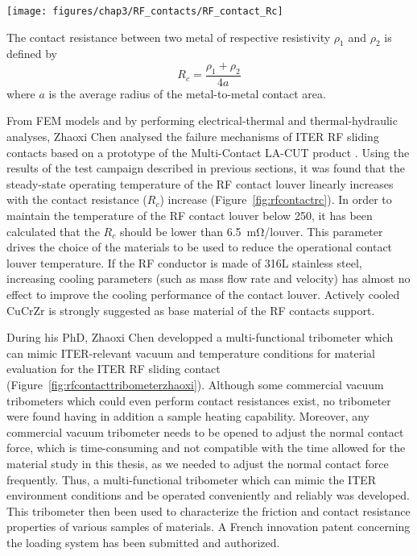 {\begin{marginfigure}
	\centering
	\texttt{[image: figures/chap3/RF\_contacts/RF\_contact\_Rc]}
	\caption{The contact resistance between two metal of respective resistivity $\rho_1$ and $\rho_2$ is defined by $$R_c=\frac{\rho_1+\rho_2}{4a}$$ where $a$ is the average radius of the metal-to-metal contact area\cite{holm2011}.}
	\label{fig:rfcontactrc}
\end{marginfigure}

From FEM models and by performing electrical-thermal and thermal-hydraulic analyses, Zhaoxi Chen analysed the failure mechanisms of ITER RF sliding contacts based on a prototype of the Multi-Contact LA-CUT product . Using the results of the test campaign described in previous sections, it was found that the steady-state operating temperature of the RF contact louver linearly increases with the contact resistance ($R_c$) increase (Figure~\ref{fig:rfcontactrc}). In order to maintain the temperature of the RF contact louver below 250\degC, it has been calculated that the $R_c$ should be lower than 6.5~$\si{\milli\ohm}$/louver. This parameter drives the choice of the materials to be used to reduce the operational contact louver temperature. If the RF conductor is made of 316L stainless steel, increasing cooling parameters (such as mass flow rate and velocity) has almost no effect to improve the cooling performance of the contact louver. Actively cooled CuCrZr is strongly suggested as base material of the RF contacts support. 

During his PhD, Zhaoxi Chen developped a multi-functional tribometer  which can mimic ITER-relevant vacuum and temperature conditions for material evaluation for the ITER RF sliding contact (Figure~\ref{fig:rfcontacttribometerzhaoxi}). Although some commercial vacuum tribometers which could even perform contact resistances exist, no tribometer were found having in addition a sample heating capability. Moreover, any commercial vacuum tribometer needs to be opened to adjust the normal contact force, which is time-consuming and not compatible with the time allowed for the material study in this thesis, as we needed to adjust the normal contact force frequently. Thus, a multi-functional tribometer which can mimic the ITER environment conditions and be operated conveniently and reliably was developed. This tribometer then been used to characterize the friction and contact resistance properties of various samples of materials. A French innovation patent concerning the loading system has been submitted and authorized.   


}

